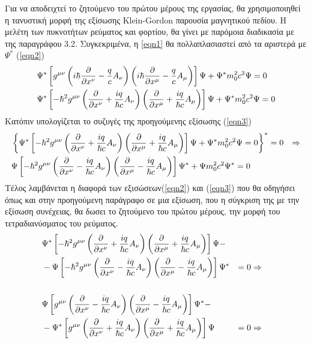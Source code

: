 Για να αποδειχτεί το ζητούμενο του πρώτου μέρους της εργασίας, θα χρησιμοποιηθεί η τανυστική μορφή της εξίσωσης \textlatin{Klein-Gordon} παρουσία μαγνητικού πεδίου. H μελέτη των πυκνοτήτων ρεύματος και φορτίου, θα γίνει με  παρόμοια  διαδικασία  με της παραγράφου 3.2. Συγκεκριμένα, η \ref{eqn1} θα πολλαπλασιαστεί από τα αριστερά με $\Psi^*$ (\ref{eqn2}) 
\begin{align}
  \notag &\Psi^* \left[  g^{\mu\nu} \left(  i \hbar\frac{\partial }{\partial x^\nu}-\frac{q}{c}A_\nu \right)  \left(  i \hbar\frac{\partial }{\partial x^\mu}-\frac{q}{c}A_\mu \right) \right]  \Psi + \Psi^* m_0^2 c^2 \Psi=0 
  \\&\Psi^* \left[  -\hbar^2 g^{\mu\nu} \left(  \frac{\partial }{\partial x^\nu}+\frac{iq}{\hbar c}A_\nu \right)  \left(  \frac{\partial }{\partial x^\mu}+\frac{iq}{\hbar c}A_\mu \right) \right]  \Psi + \Psi^* m_0^2 c^2 \Psi=0 
  \label{eqn2}
\end{align}
Κατόπιν υπολογίζεται το συζυγές της προηγούμενης εξίσωσης (\ref{eqn3})
\begin{align}
  \notag  &\left\{ \Psi^* \left[  -\hbar^2 g^{\mu\nu} \left(  \frac{\partial }{\partial x^\nu}+\frac{iq}{\hbar c}A_\nu \right)  \left(  \frac{\partial }{\partial x^\mu}+\frac{iq}{\hbar c}A_\mu \right) \right]  \Psi + \Psi^* m_0^2 c^2 \Psi=0  \right\} ^*=0 &\Rightarrow
  \\ &\Psi \left[  -\hbar^2 g^{\mu\nu} \left(  \frac{\partial }{\partial x^\nu}-\frac{iq}{\hbar c}A_\nu \right)  \left(  \frac{\partial }{\partial x^\mu}-\frac{iq}{\hbar c}A_\mu \right) \right]  \Psi^* + \Psi m_0^2 c^2 \Psi^*=0 
  \label{eqn3}
\end{align}
Τέλος λαμβάνεται η διαφορά των εξισώσεων(\ref{eqn2}) και (\ref{eqn3}) που θα οδηγήσει όπως και στην προηγούμενη παράγραφο σε μια εξίσωση, που η σύγκριση της με την εξίσωση συνέχειας, θα δωσει το ζητούμενο του πρώτου μέρους, την μορφή του τετραδιανύσματος του ρεύματος. 
\begin{align*}
  &\Psi^* \left[  -\hbar^2 g^{\mu\nu} \left(  \frac{\partial }{\partial x^\nu}+\frac{iq}{\hbar c}A_\nu \right)  \left(  \frac{\partial }{\partial x^\mu}+\frac{iq}{\hbar c}A_\mu \right) \right]  \Psi- 
  \\ &-\Psi \left[  -\hbar^2 g^{\mu\nu} \left(  \frac{\partial }{\partial x^\nu}-\frac{iq}{\hbar c}A_\nu \right)  \left(  \frac{\partial }{\partial x^\mu}-\frac{iq}{\hbar c}A_\mu \right) \right]  \Psi^* &=0 &\Rightarrow
  \\
  \\ &\Psi \left[  g^{\mu\nu} \left(  \frac{\partial }{\partial x^\nu}-\frac{iq}{\hbar c}A_\nu \right)  \left(  \frac{\partial }{\partial x^\mu}-\frac{iq}{\hbar c}A_\mu \right) \right]  \Psi^*- 
  \\ & -\Psi^* \left[  g^{\mu\nu} \left(  \frac{\partial }{\partial x^\nu}+\frac{iq}{\hbar c}A_\nu \right)  \left(  \frac{\partial }{\partial x^\mu}+\frac{iq}{\hbar c}A_\mu \right) \right]  \Psi &=0 &\Rightarrow
\end{align*}

